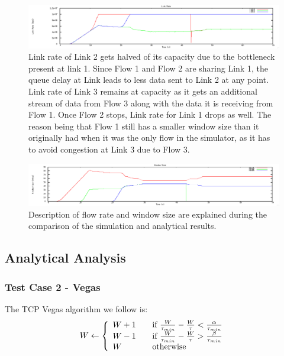 \documentclass[12pt]{article}
\begin{document}
\begin{figure}[!ht]
\centering \includegraphics[bb= 0 0 1300 250, scale=.35]{figures/Test2_Vegas/link_rate.png}
\caption{Link rate of Link 2 gets halved of its capacity due to the bottleneck present at link 1. Since Flow 1 and Flow 2 are sharing Link 1, the queue delay at Link leads to less data sent to Link 2 at any point. Link rate of Link 3 remains at capacity as it gets an additional stream of data from Flow 3 along with the data it is receiving from Flow 1. Once Flow 2 stops, Link rate for Link 1 drops as well. The reason being that Flow 1 still has a smaller window size than it originally had when it was the only flow in the simulator, as it has to avoid congestion at Link 3 due to Flow 3. }
\label{fig:test2_vegas_link_rate}
\end{figure}

\begin{figure}[!ht]
\centering \includegraphics[bb= 0 0 1300 250, scale=.35]{figures/Test2_Vegas/window_size.png}
\caption{Description of flow rate and window size are explained during the comparison of the simulation and analytical results. }
\label{fig:test2_vegas_window_size}
\end{figure}

\clearpage


\subsection{Analytical Analysis}
\subsubsection{Test Case 2 - Vegas}


The TCP Vegas algorithm we follow is:
\[ W \leftarrow \left\{
  \begin{array}{l l}
    W+1 & \quad \text{if }\frac{W}{\tau_{min}} - \frac{W}{\tau} < \frac{\alpha}{\tau_{min}}\\
    W-1 & \quad \text{if }\frac{W}{\tau_{min}} - \frac{W}{\tau} > \frac{\beta}{\tau_{min}}\\
    W & \quad \text{otherwise}\\
  \end{array} \right.\]
\end{document}

